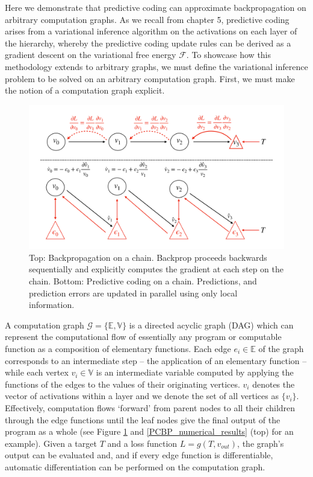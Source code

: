 Here we demonstrate that predictive coding can approximate backpropagation on arbitrary computation graphs. As we recall from chapter 5, predictive coding arises from a variational inference algorithm on the activations on each layer of the hierarchy, whereby the predictive coding update rules can be derived as a gradient descent on the variational free energy $\mathcal{F}$. To showcase how this methodology extends to arbitrary graphs, we must define the variational inference problem to be solved on an arbitrary computation graph. First, we must make the notion of a computation graph explicit. 

\begin{figure}[ht]
    \centering
    \includegraphics[width=\textwidth]{chapter_6_figures/pc_chain_schematic_new.pdf}
    \caption{Top: Backpropagation on a chain. Backprop proceeds backwards sequentially and  explicitly computes the gradient at each step on the chain. Bottom: Predictive coding on a chain.  Predictions, and prediction errors are updated in parallel using only local information.}
\label{main_PCBP_schematic}
\end{figure}

A computation graph $\mathcal{G} = \{\mathbb{E},\mathbb{V}\}$ is a directed acyclic graph (DAG) which can represent the computational flow of essentially any program or computable function as a composition of elementary functions. Each edge $e_i \in \mathbb{E}$ of the graph corresponds to an intermediate step -- the application of an elementary function -- while each vertex $v_i \in \mathbb{V}$ is an intermediate variable computed by applying the functions of the edges to the values of their originating vertices. $v_i$ denotes the vector of activations within a layer and we denote the set of all vertices as $\{v_i\}$. Effectively, computation flows `forward' from parent nodes to all their children through the edge functions until the leaf nodes give the final output of the program as a whole (see Figure \ref{main_PCBP_schematic} and \ref{PCBP_numerical_results} (top) for an example). Given a target $T$ and a loss function $L = g(T, v_{out})$, the graph's output can be evaluated and, and if every edge function is differentiable, automatic differentiation can be performed on the computation graph.

